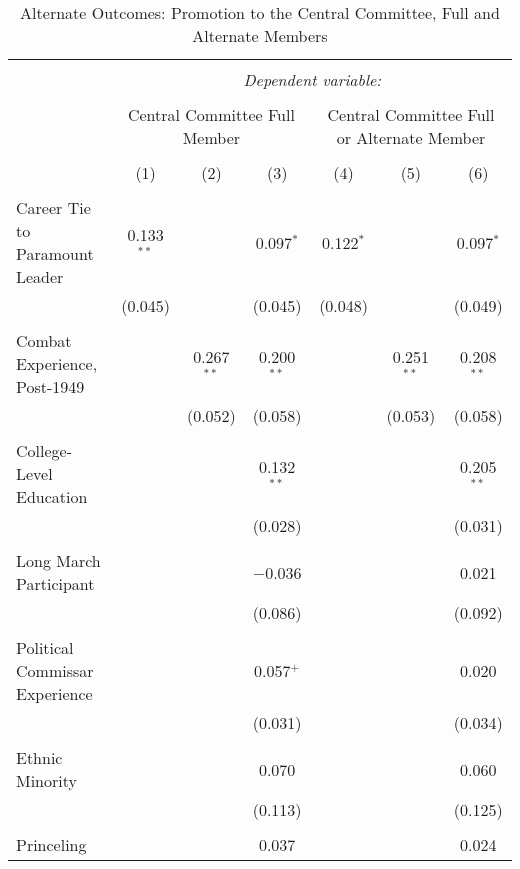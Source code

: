
\begin{table}[!htbp] \centering 
  \caption{Alternate Outcomes: Promotion to the Central Committee, Full and Alternate Members} 
  \label{table_a3} 
\begin{tabular}{@{\extracolsep{5pt}}lcccccc} 
\\[-1.8ex]\hline 
\hline \\[-1.8ex] 
 & \multicolumn{6}{c}{\textit{Dependent variable:}} \\ 
\cline{2-7} 
\\[-1.8ex] & \multicolumn{3}{c}{Central Committee Full Member} & \multicolumn{3}{c}{Central Committee Full or Alternate Member} \\ 
\\[-1.8ex] & (1) & (2) & (3) & (4) & (5) & (6)\\ 
\hline \\[-1.8ex] 
 Career Tie to Paramount Leader & 0.133$^{**}$ &  & 0.097$^{*}$ & 0.122$^{*}$ &  & 0.097$^{*}$ \\ 
  & (0.045) &  & (0.045) & (0.048) &  & (0.049) \\ 
  & & & & & & \\ 
 Combat Experience, Post-1949 &  & 0.267$^{**}$ & 0.200$^{**}$ &  & 0.251$^{**}$ & 0.208$^{**}$ \\ 
  &  & (0.052) & (0.058) &  & (0.053) & (0.058) \\ 
  & & & & & & \\ 
 College-Level Education &  &  & 0.132$^{**}$ &  &  & 0.205$^{**}$ \\ 
  &  &  & (0.028) &  &  & (0.031) \\ 
  & & & & & & \\ 
 Long March Participant &  &  & $-$0.036 &  &  & 0.021 \\ 
  &  &  & (0.086) &  &  & (0.092) \\ 
  & & & & & & \\ 
 Political Commissar Experience &  &  & 0.057$^{+}$ &  &  & 0.020 \\ 
  &  &  & (0.031) &  &  & (0.034) \\ 
  & & & & & & \\ 
 Ethnic Minority &  &  & 0.070 &  &  & 0.060 \\ 
  &  &  & (0.113) &  &  & (0.125) \\ 
  & & & & & & \\ 
 Princeling &  &  & 0.037 &  &  & 0.024 \\ 

\end{tabular}
\end{table}
